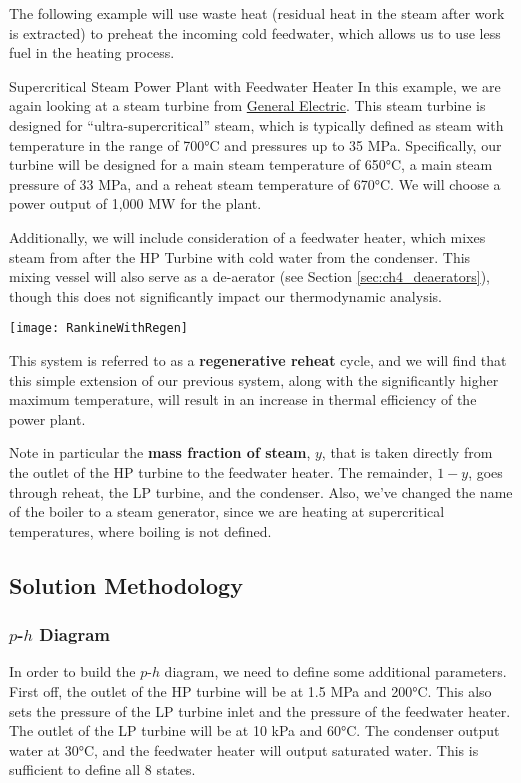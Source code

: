 The following example will use waste heat (residual heat in the steam after work is extracted) to preheat the incoming cold feedwater, which allows us to use less fuel in the heating process.

\begin{example}[label=ex:ch4FeedwaterHeater]{Supercritical Steam Power Plant with Feedwater Heater}
  In this example, we are again looking at a steam turbine from  \href{https://www.ge.com/steam-power/products/steam-turbines}{General Electric}.  This steam turbine is designed for ``ultra-supercritical'' steam, which is typically defined as steam with temperature in the range of 700°C and pressures up to 35 MPa.
Specifically, our turbine will be designed for a main steam temperature of 650°C, a main steam pressure of 33 MPa, and a reheat steam temperature of 670°C.  We will choose a power output of 1,000 MW for the plant.
  
Additionally, we will include consideration of a feedwater heater, which mixes steam from after the HP Turbine with cold water from the condenser.  This mixing vessel will also serve as a de-aerator (see Section \ref{sec:ch4_deaerators}), though this does not significantly impact our thermodynamic analysis.

  \begin{center}
    \texttt{[image: RankineWithRegen]}
  \end{center}  

  This system is referred to as a {\bf regenerative reheat} cycle, and we will find that this simple extension of our previous system, along with the significantly higher maximum temperature, will result in an increase in thermal efficiency of the power plant.

  Note in particular the {\bf mass fraction of steam}, $y$, that is taken directly from the outlet of the HP turbine to the feedwater heater.  The remainder, $1-y$, goes through reheat, the LP turbine, and the condenser.  Also, we've changed the name of the boiler to a steam generator, since we are heating at supercritical temperatures, where boiling is not defined.

  \subsection*{Solution Methodology}
  \subsubsection*{$p$-$h$ Diagram}
  In order to build the $p$-$h$ diagram, we need to define some additional parameters.  First off, the outlet of the HP turbine will be at 1.5 MPa and 200°C.  This also sets the pressure of the LP turbine inlet and the pressure of the feedwater heater.  The outlet of the LP turbine will be at 10 kPa and 60°C.  The condenser output water at 30°C, and the feedwater heater will output saturated water.  This is sufficient to define all 8 states.
  

\end{example}
